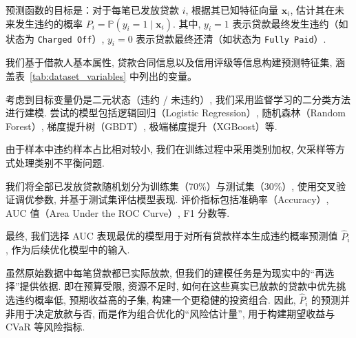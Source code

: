 \documentclass{write_paper}
\begin{document}
 
预测函数的目标是：对于每笔已发放贷款 $i$, 根据其已知特征向量 $\mathbf{x}_i$, 估计其在未来发生违约的概率 $P_i = \mathbb{P}(y_i = 1 \mid \mathbf{x}_i)$. 其中, $y_i=1$ 表示贷款最终发生违约（如状态为 \texttt{Charged Off}）, $y_i=0$ 表示贷款最终还清（如状态为 \texttt{Fully Paid}）. 

 
我们基于借款人基本属性, 贷款合同信息以及信用评级等信息构建预测特征集, 涵盖表~\ref{tab:dataset_variables} 中列出的变量。

 
考虑到目标变量仍是二元状态（违约 / 未违约）, 我们采用监督学习的二分类方法进行建模. 尝试的模型包括逻辑回归（Logistic Regression）, 随机森林（Random Forest）, 梯度提升树（GBDT）, 极端梯度提升（XGBoost）等. 

由于样本中违约样本占比相对较小, 我们在训练过程中采用类别加权, 欠采样等方式处理类别不平衡问题. 

 

我们将全部已发放贷款随机划分为训练集（70\%）与测试集（30\%）, 使用交叉验证调优参数, 并基于测试集评估模型表现. 评价指标包括准确率（Accuracy）, AUC 值（Area Under the ROC Curve）, F1 分数等. 

最终, 我们选择 AUC 表现最优的模型用于对所有贷款样本生成违约概率预测值 $\hat{P}_i$, 作为后续优化模型中的输入. 
 
虽然原始数据中每笔贷款都已实际放款, 但我们的建模任务是为现实中的“再选择”提供依据. 即在预算受限, 资源不足时, 如何在这些真实已放款的贷款中优先挑选违约概率低, 预期收益高的子集, 构建一个更稳健的投资组合. 因此, $\hat{P}_i$ 的预测并非用于决定放款与否, 而是作为组合优化的“风险估计量”, 用于构建期望收益与 CVaR 等风险指标. 
\end{document}
